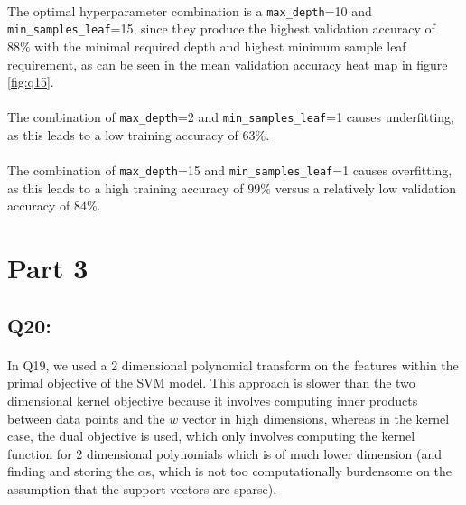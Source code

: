 \documentclass{article}
\newcommand{\code}[1]{\texttt{#1}}
\begin{document}
    \paragraph*{}
    The optimal hyperparameter combination is a \code{max\_depth}=10 and \code{min\_samples\_leaf}=15, since they produce the highest validation accuracy of $88\%$ with the minimal required depth and highest minimum sample leaf requirement, as can be seen in the mean validation accuracy heat map in figure \ref{fig:q15}.
    \paragraph*{}
    The combination of \code{max\_depth}=2 and \code{min\_samples\_leaf}=1 causes underfitting, as this leads to a low training accuracy of $63\%$.
    \paragraph*{}
    The combination of \code{max\_depth}=15 and \code{min\_samples\_leaf}=1 causes overfitting, as this leads to a high training accuracy of $99\%$ versus a relatively low validation accuracy of $84\%$.
\section*{Part 3}
\subsection*{Q20:}
    \paragraph*{}
    In Q19, we used a 2 dimensional polynomial transform on the features within the primal objective of the SVM model. This approach is slower than the two dimensional kernel objective because it involves computing inner products between data points and the $w$ vector in high dimensions, whereas in the kernel case, the dual objective is used, which only involves computing the kernel function for 2 dimensional polynomials which is of much lower dimension (and finding and storing the $\alpha$s, which is not too computationally burdensome on the assumption that the support vectors are sparse).
\end{document}
